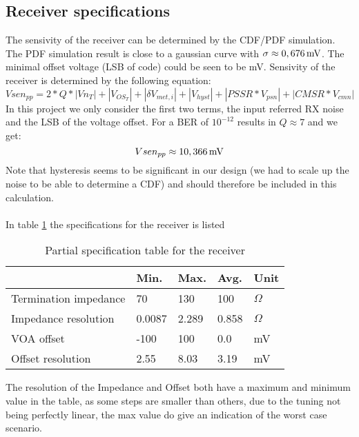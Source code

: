 \subsection{Receiver specifications }

The sensivity of the receiver can be determined by the CDF/PDF simulation. The PDF simulation result is close to a gaussian curve with $\sigma \approx \unit[0,676]{mV}$. The minimal offset voltage (LSB of code) could be seen to be \unit[0,9]{mV}. Sensivity of the receiver is determined by the following equation:
\[
 Vsen_{pp} = 2*Q*|Vn_T| + |V_{OS_T}| + |\delta V_{met,i}| + |V_{hyst}| + |PSSR*V_{psn}| + |CMSR*V_{cmn}|
\]
In this project we only consider the first two terms, the input referred RX noise and the LSB of the voltage offset. For a BER of $10^{-12}$ results in $Q\approx 7$ and we get:
\[
 Vsen_{pp} \approx \unit[10,366]{mV}
\]
Note that hysteresis seems to be significant in our design (we had to scale up the noise to be able to determine a CDF) and should therefore be included in this calculation.\\\\
In table \ref{tab:specifications} the specifications for the receiver is listed

\begin{table}[H]
  \centering
  \begin{tabular}{l|l|l|l|l}
    & Min. & Max. & Avg. & Unit \\
    \hline
	Termination impedance & 70 & 130 & 100 & $\Omega$\\
	Impedance resolution & 0.0087 & 2.289 & 0.858 & $\Omega$\\
	VOA offset & -100 & 100 & 0.0 & mV\\
	Offset resolution & 2.55 & 8.03 & 3.19 & mV\\
  \end{tabular}
  \caption{Partial specification table for the receiver}
  \label{tab:specifications}
\end{table}

The resolution of the Impedance and Offset both have a maximum and minimum value in the table, as some steps are smaller than others, due to the tuning not being perfectly linear, the max value do give an indication of the worst case scenario.
